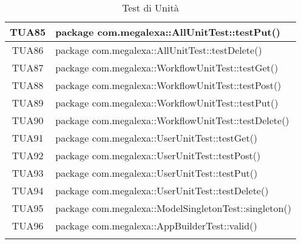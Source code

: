 \begin{longtable}{|c|m{28em}|}
	TUA85 & package com.megalexa::AllUnitTest::testPut()\\ \hline
	TUA86 & package com.megalexa::AllUnitTest::testDelete()\\ \hline
	TUA87 & package com.megalexa::WorkflowUnitTest::testGet()\\ \hline
	TUA88 & package com.megalexa::WorkflowUnitTest::testPost()\\ \hline
	TUA89 & package com.megalexa::WorkflowUnitTest::testPut()\\ \hline
	TUA90 & package com.megalexa::WorkflowUnitTest::testDelete()\\ \hline
	TUA91 & package com.megalexa::UserUnitTest::testGet()\\ \hline
	TUA92 & package com.megalexa::UserUnitTest::testPost()\\ \hline
	TUA93 & package com.megalexa::UserUnitTest::testPut()\\ \hline
	TUA94 & package com.megalexa::UserUnitTest::testDelete()\\ \hline
	TUA95 & package com.megalexa::ModelSingletonTest::singleton() \\ \hline
	TUA96 & package com.megalexa::AppBuilderTest::valid() \\ \hline
	\caption[Test di Unità]{Test di Unità}
	\label{tabella:test2}
\end{longtable}
\clearpage
